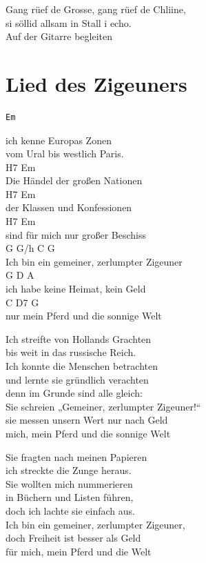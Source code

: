 \documentclass[
  letterpaper,
]{scrbook}
\begin{document}
Gang rüef de Grosse, gang rüef de Chliine,\\
si söllid allsam in Stall i echo.\\
Auf der Gitarre begleiten

\hypertarget{lied-des-zigeuners}{%
\chapter{Lied des Zigeuners}\label{lied-des-zigeuners}}

\begin{verbatim}
Em
\end{verbatim}

ich kenne Europas Zonen\\
vom Ural bis westlich Paris.\\
H7 Em\\
Die Händel der großen Nationen\\
H7 Em\\
der Klassen und Konfessionen\\
H7 Em\\
sind für mich nur großer Beschiss\\
G G/h C G\\
Ich bin ein gemeiner, zerlumpter Zigeuner\\
G D A\\
ich habe keine Heimat, kein Geld\\
C D7 G\\
nur mein Pferd und die sonnige Welt

Ich streifte von Hollands Grachten\\
bis weit in das russische Reich.\\
Ich konnte die Menschen betrachten\\
und lernte sie gründlich verachten\\
denn im Grunde sind alle gleich:\\
Sie schreien „Gemeiner, zerlumpter Zigeuner!{}``\\
sie messen unsern Wert nur nach Geld\\
mich, mein Pferd und die sonnige Welt

Sie fragten nach meinen Papieren\\
ich streckte die Zunge heraus.\\
Sie wollten mich nummerieren\\
in Büchern und Listen führen,\\
doch ich lachte sie einfach aus.\\
Ich bin ein gemeiner, zerlumpter Zigeuner,\\
doch Freiheit ist besser als Geld\\
für mich, mein Pferd und die Welt
\end{document}
